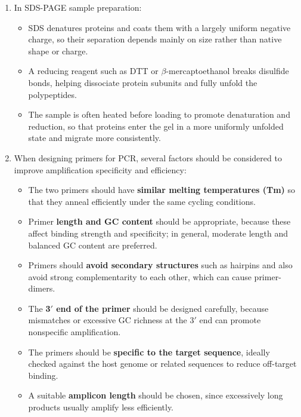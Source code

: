 \documentclass[12pt,a4paper]{article}
\begin{document}
\begin{enumerate}[parsep=0.5\baselineskip]
  \item In SDS-PAGE sample preparation:
  \begin{itemize}
    \item SDS denatures proteins and coats them with a largely uniform negative charge, so their separation depends mainly on size rather than native shape or charge.
    \item A reducing reagent such as DTT or $\beta$-mercaptoethanol breaks disulfide bonds, helping dissociate protein subunits and fully unfold the polypeptides.
    \item The sample is often heated before loading to promote denaturation and reduction, so that proteins enter the gel in a more uniformly unfolded state and migrate more consistently.
  \end{itemize}
  
  \item When designing primers for PCR, several factors should be considered to improve amplification specificity and efficiency:
  \begin{itemize}
    \item The two primers should have \textbf{similar melting temperatures (Tm)} so that they anneal efficiently under the same cycling conditions.
    \item Primer \textbf{length and GC content} should be appropriate, because these affect binding strength and specificity; in general, moderate length and balanced GC content are preferred. 
    \item Primers should \textbf{avoid secondary structures} such as hairpins and also avoid strong complementarity to each other, which can cause primer-dimers.
    \item The \textbf{3$'$ end of the primer} should be designed carefully, because mismatches or excessive GC richness at the 3$'$ end can promote nonspecific amplification. 
    \item The primers should be \textbf{specific to the target sequence}, ideally checked against the host genome or related sequences to reduce off-target binding.
    \item A suitable \textbf{amplicon length} should be chosen, since excessively long products usually amplify less efficiently.
  \end{itemize}


\end{enumerate}
\end{document}
